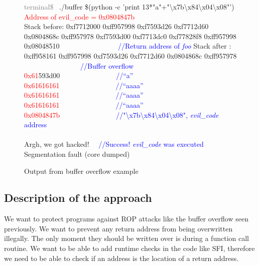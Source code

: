 \documentclass[11pt]{sdm}
\begin{document}
\begin{figure}[!ht]
\textcolor{gray}{terminal\$~} ./buffer \$(python -c 'print 13*"a"+"\textbackslash{x7b}\textbackslash{x84}\textbackslash{x04}\textbackslash{x08}"') \\
\textcolor{red}{Address of evil\_code = 0x0804847b} \\
Stack before: \hfill \break
0xf7712000    \hfill \break
0xff957998    \hfill \break
0xf7593d26    \hfill \break
0xf7712d60    \hfill \break
0x0804868c    \hfill \break
0xff957978    \hfill \break
0xf7593d00    \hfill \break
0xf7713dc0    \hfill \break
0xf77828f8    \hfill \break
0xff957998    \hfill \break
0x08048510    ~~~~~~~~~~~~~~~~\textcolor{blue}{//Return address of \textit{foo}}\hfill \break
              \hfill \break
Stack after : \hfill \break
0xff958161    \hfill \break
0xff957998    \hfill \break
0xf7593d26    \hfill \break
0xf7712d60    \hfill \break
0x0804868c    \hfill \break
0xff957978   			   ~~~~~~~~~~~~~~~~\textcolor{blue}{//Buffer overflow}\hfill \break
\textcolor{red}{0x61}593d00~~~~~~~~~~~~~~~~\textcolor{blue}{//``a''   } \hfill \break
\textcolor{red}{0x61616161}~~~~~~~~~~~~~~~~\textcolor{blue}{//``aaaa''} \hfill \break
\textcolor{red}{0x61616161}~~~~~~~~~~~~~~~~\textcolor{blue}{//``aaaa''} \hfill \break
\textcolor{red}{0x61616161}~~~~~~~~~~~~~~~~\textcolor{blue}{//``aaaa''} \hfill \break
\textcolor{red}{0x0804847b}~~~~~~~~~~~~~~~~\textcolor{blue}{//"\textbackslash{x7b}\textbackslash{x84}\textbackslash{x04}\textbackslash{x08}",  \textit{evil\_code} address \\}
\\
Argh, we got hacked! ~~\textcolor{blue}{//Success! \textit{evil\_code} was executed}\\
Segmentation fault (core dumped)
\caption{Output from buffer overflow example}
\label{output_buffer}
\end{figure}


\subsection{Description of the approach}
\label{sub:Description of the approach}
	We want to protect programs against ROP attacks like the buffer overflow seen previously. We want to prevent any return address from being overwritten illegally. The only moment they should be written over is during a function call routine.
We want to be able to add runtime checks in the code like SFI, therefore we need to be able to check if an address is the location of a return address. 
\end{document}
